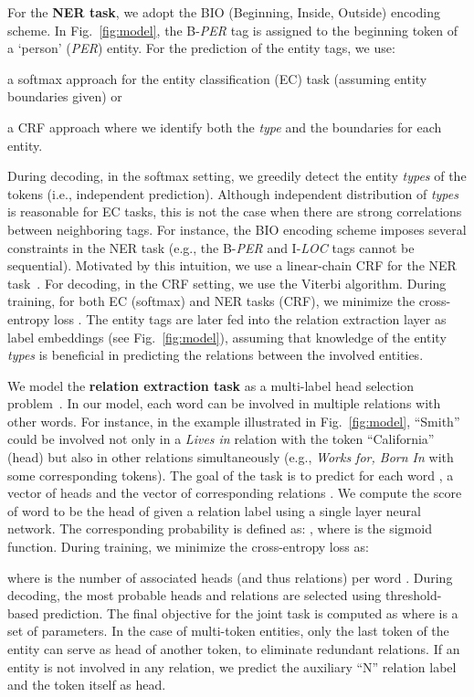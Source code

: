 \documentclass[11pt,a4paper]{article}
\newcommand{\eg}{e.g., }
\newcommand{\ie}{i.e., }
\newcommand{\figref}[1]{Fig.~\ref{#1}}    \newcommand{\Figref}[1]{Figure~\ref{#1}}  \newcommand{\tabref}[1]{Table~\ref{#1}}
\begin{document}
For the \textbf{NER task}, we adopt the BIO (Beginning, Inside, Outside) encoding scheme. 
In \figref{fig:model}, the B-\textit{PER} tag is assigned to the beginning token of a `person' (\emph{PER}) entity. For the prediction of the entity tags, we use:
\begin{enumerate*}[label=(\roman*)]
\item a softmax approach for the entity classification (EC) task (assuming entity boundaries given) or
\item a CRF approach where we identify both the \emph{type} and the boundaries for each entity.
\end{enumerate*}
During decoding, in the softmax setting, we greedily detect the entity \emph{types} of the tokens (\ie independent prediction). Although  independent distribution of \emph{types} is reasonable for EC tasks, this is not the case when there are strong correlations between neighboring tags. For instance, the BIO encoding scheme imposes several constraints in the NER task (\eg the B-\textit{PER} and I-\textit{LOC} tags cannot be sequential). Motivated by this intuition, we use a linear-chain CRF for the NER task~\cite{lample:16}.
For decoding, in the CRF setting, we use the Viterbi algorithm. 
During training, for both EC (softmax) and NER tasks (CRF), we minimize the cross-entropy loss .
The entity tags are later fed into the relation extraction layer as label embeddings (see \figref{fig:model}), assuming that knowledge of the entity \emph{types} is beneficial in predicting the relations between the involved entities. 

We model the \textbf{relation extraction task} as a multi-label head selection problem~\citep{bekoulis:18b,zhang:16}. In our model, each word  can be involved in multiple relations with other words. For instance, in the example illustrated in \figref{fig:model}, ``Smith'' could be involved not only in a \emph{Lives in} relation with the token ``California'' (head) but also in other relations simultaneously (\eg \emph{Works for, Born In} with some corresponding tokens).
The goal of the task is to predict for each word , a vector of heads  and the vector of corresponding relations .
We compute the score  of word  to be the head of  given a relation label  using a single layer neural network.
The corresponding probability is defined as:
, where  is the sigmoid function. 
During training, we minimize the cross-entropy loss  as:

where  is the number of associated heads (and thus relations) per word . During decoding, the most probable heads and relations are selected using threshold-based prediction. 
The final objective for the joint task is computed as 
 where  is a set of parameters. In the case of multi-token entities, only the last token of the entity can serve as head of another token, to eliminate redundant relations. If an entity is not involved in any relation, we predict the auxiliary ``N'' relation label and the token itself as head.
\end{document}
